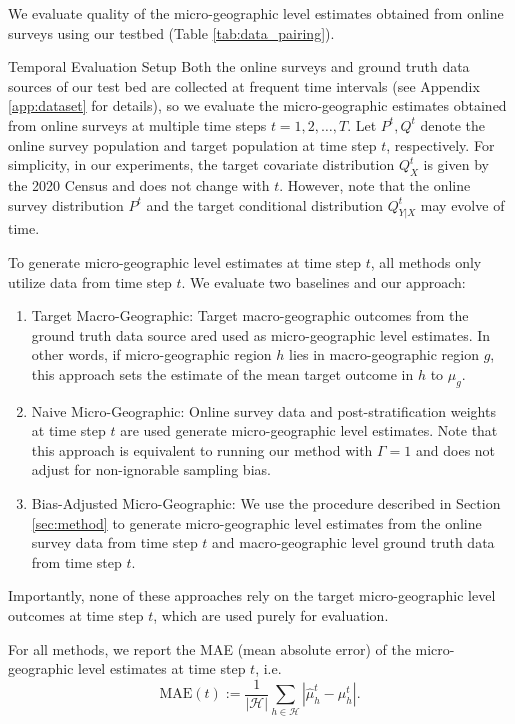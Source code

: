 We evaluate quality of the micro-geographic level estimates obtained from online surveys using our testbed (Table \ref{tab:data_pairing}).

\begin{subsection}{Temporal Evaluation Setup}
Both the online surveys and ground truth data sources of our test bed are collected at frequent time intervals (see Appendix \ref{app:dataset} for details), so we evaluate the micro-geographic estimates obtained from online surveys at multiple time steps $t=1, 2, \dots, T$. Let $P^{t}, Q^{t}$ denote the online survey population and target population at time step $t$, respectively. For simplicity, in our experiments, the target covariate distribution $Q_{X}^{t}$ is given by the 2020 Census and does not change with $t$. However, note that the online survey distribution $P^{t}$ and the target conditional distribution $Q_{Y|X}^{t}$ may evolve of time.

To generate micro-geographic level estimates at time step $t$, all methods only utilize data from time step $t$. We evaluate two baselines and our approach:
\begin{enumerate}
\item Target Macro-Geographic: Target macro-geographic outcomes from the ground truth data source ared used as micro-geographic level estimates. In other words, if micro-geographic region $h$ lies in macro-geographic region $g$, this approach sets the estimate of the mean target outcome in $h$ to $\mu_{g}$.
\item Naive Micro-Geographic: Online survey data and post-stratification weights at time step $t$ are used generate micro-geographic level estimates. Note that this approach is equivalent to running our method with $\Gamma=1$ and does not adjust for non-ignorable sampling bias.
\item Bias-Adjusted Micro-Geographic: We use the procedure described in Section \ref{sec:method} to generate micro-geographic level estimates from the online survey data from time step $t$ and macro-geographic level ground truth data from time step $t$. 
\end{enumerate}
Importantly, none of these approaches rely on the target micro-geographic level outcomes at time step $t$, which are used purely for evaluation.

For all methods, we report the MAE (mean absolute error) of the micro-geographic level estimates at time step $t$, i.e.
\[  \text{MAE}(t):= \frac{1}{|\mathcal{H}|} \sum_{h \in \mathcal{H}} | \hat{\mu}_{h}^{t} - \mu_{h}^{t}|.\]
\end{subsection}

